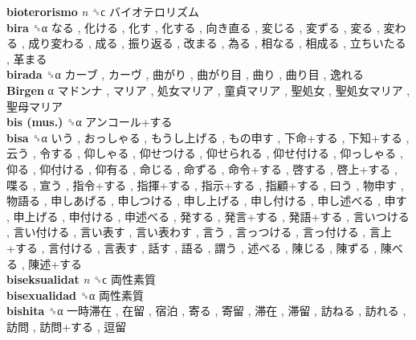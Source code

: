 \textbf{bioterorismo} \emph{n}  ␝ϲ   バイオテロリズム   \\
\textbf{bira} ␝α   なる ,  化ける ,  化す ,  化する ,  向き直る ,  変じる ,  変ずる ,  変る ,  変わる ,  成り変わる ,  成る ,  振り返る ,  改まる ,  為る ,  相なる ,  相成る ,  立ちいたる ,  革まる   \\
\textbf{birada} ␝α   カーブ ,  カーヴ ,  曲がり ,  曲がり目 ,  曲り ,  曲り目 ,  逸れる   \\
\textbf{Birgen} α   マドンナ ,  マリア ,  処女マリア ,  童貞マリア ,  聖処女 ,  聖処女マリア ,  聖母マリア   \\
\textbf{bis (mus.)} ␝α   アンコール+する   \\
\textbf{bisa} ␝α   いう ,  おっしゃる ,  もうし上げる ,  もの申す ,  下命+する ,  下知+する ,  云う ,  令する ,  仰しゃる ,  仰せつける ,  仰せられる ,  仰せ付ける ,  仰っしゃる ,  仰る ,  仰付ける ,  仰有る ,  命じる ,  命ずる ,  命令+する ,  啓する ,  啓上+する ,  喋る ,  宣う ,  指令+する ,  指揮+する ,  指示+する ,  指顧+する ,  曰う ,  物申す ,  物語る ,  申しあげる ,  申しつける ,  申し上げる ,  申し付ける ,  申し述べる ,  申す ,  申上げる ,  申付ける ,  申述べる ,  発する ,  発言+する ,  発語+する ,  言いつける ,  言い付ける ,  言い表す ,  言い表わす ,  言う ,  言っつける ,  言っ付ける ,  言上+する ,  言付ける ,  言表す ,  話す ,  語る ,  謂う ,  述べる ,  陳じる ,  陳ずる ,  陳べる ,  陳述+する   \\
\textbf{biseksualidat} \emph{n}  ␝ϲ   両性素質   \\
\textbf{bisexualidad} ␝α   両性素質   \\
\textbf{bishita} ␝α   一時滞在 ,  在留 ,  宿泊 ,  寄る ,  寄留 ,  滞在 ,  滞留 ,  訪ねる ,  訪れる ,  訪問 ,  訪問+する ,  逗留   \\
